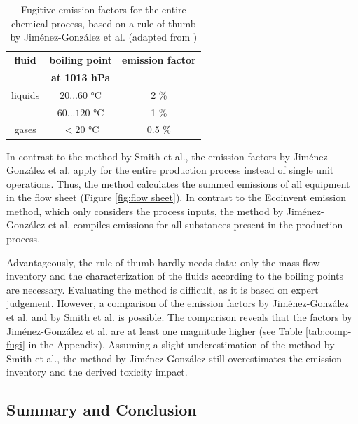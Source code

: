 \begin{table}[]
\caption{Fugitive emission factors for the entire chemical process, based on a rule of thumb by Jiménez-González et al. (adapted from \cite{JimenezGonzalez.2000}) }
\label{tab:Jimenez}
\centering
   \begin{tabular}{ccc}
   \toprule
    \textbf{fluid} & \textbf{boiling point} & \textbf{emission factor} \\
            & \textbf{at 1013 hPa }&   \\\midrule
    liquids &  $20...60$ °C   &   2 \%\\
            &   $60...120$ °C &   1 \%\\\midrule
    gases   &   $<20$ °C      &   0.5 \%\\\bottomrule
    \end{tabular}
\end{table}
In contrast to the method by Smith et al., the emission factors by Jiménez-González et al. apply for the entire production process instead of single unit operations. Thus, the method calculates the summed emissions of all equipment in the flow sheet (Figure \ref{fig:flow sheet}). In contrast to the Ecoinvent emission method, which only considers the process inputs, the method by Jiménez-González et al. compiles emissions for all substances present in the production process.

Advantageously, the rule of thumb hardly needs data: only the mass flow inventory and the characterization of the fluids according to the boiling points are necessary. Evaluating the method is difficult, as it is based on expert judgement. However, a comparison of the emission factors by  Jiménez-González et al. and by Smith et al. is possible. The comparison reveals that the factors by Jiménez-González et al. are at least one magnitude higher (see Table \ref{tab:comp-fugi} in the Appendix). Assuming a slight underestimation of the method by Smith et al., the method by Jiménez-González still overestimates the emission inventory and the derived toxicity impact.



\subsection{Summary and Conclusion}

